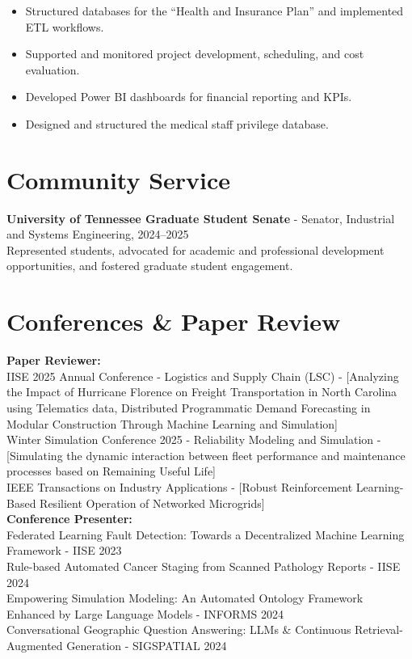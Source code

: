 \documentclass[10pt, letterpaper]{article}
\newenvironment{highlights}{
    \begin{itemize}[
        topsep=0.10 cm,
        parsep=0.10 cm,
        partopsep=0pt,
        itemsep=0pt,
        leftmargin=0 cm + 10pt
    ]
}{
    \end{itemize}
} %
\begin{document}
\begin{highlights}
    \item Structured databases for the “Health and Insurance Plan” and implemented ETL workflows.
    \item Supported and monitored project development, scheduling, and cost evaluation.
    \item Developed Power BI dashboards for financial reporting and KPIs.
    \item Designed and structured the medical staff privilege database.
\end{highlights}






\section*{Community Service}

\textbf{University of Tennessee Graduate Student Senate} - Senator, Industrial and Systems Engineering, 2024–2025\\  

\small
Represented students, advocated for academic and professional development opportunities, and fostered graduate student engagement.




\section*{Conferences \& Paper Review}
\small
\textbf{Paper Reviewer:}\\
IISE 2025 Annual Conference - Logistics and Supply Chain (LSC) - [Analyzing the Impact of Hurricane Florence on Freight
Transportation in North Carolina using Telematics data, Distributed Programmatic Demand Forecasting in Modular
Construction Through Machine Learning and Simulation]\\
Winter Simulation Conference 2025 - Reliability Modeling and Simulation - [Simulating the dynamic interaction between fleet performance and maintenance processes based on Remaining Useful Life]\\
IEEE Transactions on Industry Applications - [Robust Reinforcement Learning-Based Resilient Operation of Networked Microgrids]\\


\vspace{0.5cm}
\textbf{Conference Presenter:}\\
Federated Learning Fault Detection: Towards a Decentralized Machine Learning Framework - IISE 2023\\
\vspace{0.3cm}
Rule-based Automated Cancer Staging from Scanned Pathology Reports - IISE 2024\\
\vspace{0.3cm}
Empowering Simulation Modeling: An Automated Ontology Framework Enhanced by Large Language Models - INFORMS 2024\\
\vspace{0.3cm}
Conversational Geographic Question Answering: LLMs \& Continuous Retrieval-Augmented Generation - SIGSPATIAL 2024\\
\vspace{0.3cm}
\end{document}
